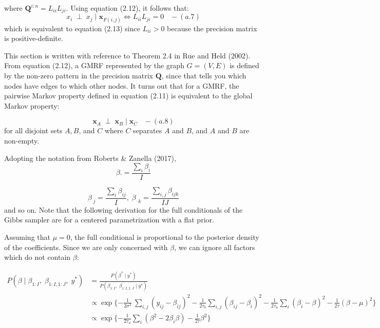 \documentclass[]{article}
\begin{document}
where \(\boldsymbol{Q}^{i:n} = L_{ii} L_{ji}\). Using equation (2.12),
it follows that:
\[x_i \; \perp \; x_j \;|\; \boldsymbol{x}_{F(i,j)} \iff L_{ii}L_{ji}=0 \;\;\; - (a.7)\]
which is equivalent to equation (2.13) since \(L_{ii}>0\) because the
precision matrix is positive-definite. \newline \newline \newline

 \newline 

This section is written with reference to Theorem 2.4 in Rue and Held
(2002). From equation (2.12), a GMRF represented by the graph
\(G = (V,E)\) is defined by the non-zero pattern in the precision matrix
\(\boldsymbol{Q}\), since that tells you which nodes have edges to which
other nodes. It turns out that for a GMRF, the pairwise Markov property
defined in equation (2.11) is equivalent to the global Markov property:

\[\boldsymbol{x}_A \; \perp \; \boldsymbol{x}_B \;|\; \boldsymbol{x}_{C} \;\;\; - (a.8) \]
for all disjoint sets \(A, B\), and \(C\) where \(C\) separates \(A\)
and \(B\), and \(A\) and \(B\) are non-empty. \newline \newline \newline

 \newline 

Adopting the notation from Roberts \& Zanella (2017),
\[\beta. = \frac{\sum_i\beta_i}{I}\]

\[\beta_{^.j} = \frac{\sum_i\beta_{ij}}{I}, \; \beta_{^{..}k} = \frac{\sum_{i,j}\beta_{ijk}}{IJ}\]
and so on. Note that the following derivation for the full conditionals
of the Gibbs sampler are for a centered parametrization with a flat
prior.

Assuming that \(\mu=0\), the full conditional is proportional to the
posterior density of the coefficients. Since we are only concerned with
\(\beta\), we can ignore all factors which do not contain \(\beta\):

\[
\begin{aligned}
P(\beta \;|\; \beta_{1:I}, \; \beta_{1:I,1:J}, \; y^*) &= \frac{P(\beta^* \;|\; y^*)}{P(\beta_{1:I},\; \beta_{1:I, 1:J}\;|\; y^*)} \\
&\propto \exp \{-\frac{1}{2\sigma^2}\ \sum_{i,j} (y_{ij}-\beta_{ij})^2 - \frac{1}{2\tau_b}\sum_{i,j} (\beta_{ij}-\beta_{i})^2 -\frac{1}{2\tau_a} \sum_{i} (\beta_{i}-\beta)^2 - \frac{1}{2\tau}(\beta - \mu)^2 \}\\
&\propto \exp \{ -\frac{1}{2\tau_a} \sum_i (\beta^2 -2\beta_i\beta) - \frac{1}{2\tau}\beta^2\} \;\;\; 
\end{aligned}
\]
\end{document}
